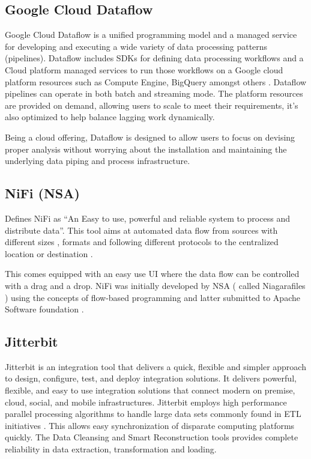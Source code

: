 \subsection{Google Cloud Dataflow}
    
    Google Cloud Dataflow is a unified programming model and a managed
    service for developing and executing a wide variety of data
    processing patterns (pipelines). Dataflow includes SDKs for
    defining data processing workflows and a Cloud platform managed
    services to run those workflows on a Google cloud platform
    resources such as Compute Engine, BigQuery amongst others
    \cite{www-Dataflow}. Dataflow pipelines can operate in both batch
    and streaming mode. The platform resources are provided on demand,
    allowing users to scale to meet their requirements, it’s also
    optimized to help balance lagging work dynamically.

    Being a cloud offering, Dataflow is designed to allow users to focus
    on devising proper analysis without worrying about the installation
    and maintaining \cite{www-GoogleLiveStream} the underlying data
    piping and process infrastructure.
    
\subsection{NiFi (NSA)}

    \cite{www-nifi} Defines NiFi as ``An Easy to use, powerful and
    reliable system to process and distribute data''.  This tool aims
    at automated data flow from sources with different sizes , formats
    and following different protocols to the centralized location or
    destination \cite{www-hortanworks}.
    
    This comes equipped with an easy use UI where the data flow can be
    controlled with a drag and a drop.  NiFi was initially developed
    by NSA ( called Niagarafiles ) using the concepts of flow-based
    programming and latter submitted to Apache Software
    foundation \cite{www-forbes}.
    
\subsection{Jitterbit}

    Jitterbit \cite{datasheet} is an integration tool that delivers a
    quick, flexible and simpler approach to design, configure, test,
    and deploy integration solutions. It delivers powerful, flexible,
    and easy to use integration solutions that connect modern on
    premise, cloud, social, and mobile infrastructures. Jitterbit
    employs high performance parallel processing algorithms to handle
    large data sets commonly found in ETL initiatives
    \cite{www-jitetl}. This allows easy synchronization of disparate
    computing platforms quickly. The Data Cleansing and Smart
    Reconstruction tools provides complete reliability in data
    extraction, transformation and loading.

